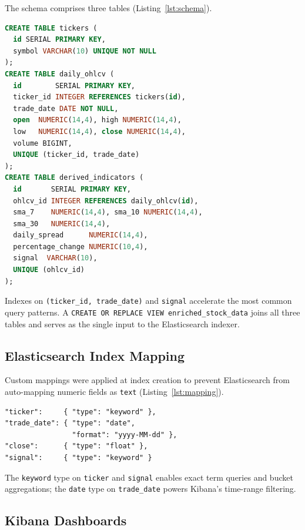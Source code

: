 \documentclass[conference]{IEEEtran}
\begin{document}
The schema comprises three tables (Listing~\ref{lst:schema}).

\begin{lstlisting}[language=SQL, caption={Normalised PostgreSQL schema.}, label={lst:schema}]
CREATE TABLE tickers (
  id SERIAL PRIMARY KEY,
  symbol VARCHAR(10) UNIQUE NOT NULL
);
CREATE TABLE daily_ohlcv (
  id        SERIAL PRIMARY KEY,
  ticker_id INTEGER REFERENCES tickers(id),
  trade_date DATE NOT NULL,
  open  NUMERIC(14,4), high NUMERIC(14,4),
  low   NUMERIC(14,4), close NUMERIC(14,4),
  volume BIGINT,
  UNIQUE (ticker_id, trade_date)
);
CREATE TABLE derived_indicators (
  id       SERIAL PRIMARY KEY,
  ohlcv_id INTEGER REFERENCES daily_ohlcv(id),
  sma_7    NUMERIC(14,4), sma_10 NUMERIC(14,4),
  sma_30   NUMERIC(14,4),
  daily_spread      NUMERIC(14,4),
  percentage_change NUMERIC(10,4),
  signal  VARCHAR(10),
  UNIQUE (ohlcv_id)
);
\end{lstlisting}

Indexes on \texttt{(ticker\_id, trade\_date)} and \texttt{signal} accelerate
the most common query patterns. A \texttt{CREATE OR REPLACE VIEW
enriched\_stock\_data} joins all three tables and serves as the single input
to the Elasticsearch indexer.

\subsection{Elasticsearch Index Mapping}

Custom mappings were applied at index creation to prevent Elasticsearch from
auto-mapping numeric fields as \texttt{text} (Listing~\ref{lst:mapping}).

\begin{lstlisting}[caption={Key Elasticsearch field mappings.}, label={lst:mapping}]
"ticker":     { "type": "keyword" },
"trade_date": { "type": "date",
                "format": "yyyy-MM-dd" },
"close":      { "type": "float" },
"signal":     { "type": "keyword" }
\end{lstlisting}

The \texttt{keyword} type on \texttt{ticker} and \texttt{signal} enables exact
term queries and bucket aggregations; the \texttt{date} type on
\texttt{trade\_date} powers Kibana's time-range filtering.

\subsection{Kibana Dashboards}
\end{document}
